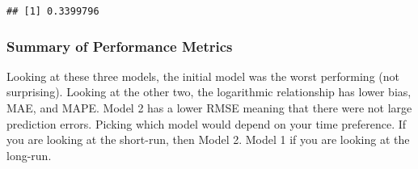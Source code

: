 \documentclass[
]{article}
\begin{document}
\begin{verbatim}
## [1] 0.3399796
\end{verbatim}

\hypertarget{summary-of-performance-metrics}{%
\subsubsection{Summary of Performance
Metrics}\label{summary-of-performance-metrics}}

Looking at these three models, the initial model was the worst
performing (not surprising). Looking at the other two, the logarithmic
relationship has lower bias, MAE, and MAPE. Model 2 has a lower RMSE
meaning that there were not large prediction errors. Picking which model
would depend on your time preference. If you are looking at the
short-run, then Model 2. Model 1 if you are looking at the long-run.
\end{document}
